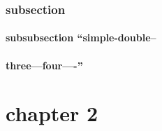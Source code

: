\documentclass{book}
\renewcommand{\_}{\Texinfounderscore\discretionary{}{}{}}
\begin{document}
\subsection{{subsection}}
\label{anchor:subsection}%


\label{anchor:anchor}%

\subsubsection{{subsubsection ``simple-double--}}
\label{anchor:subsubsection-_0060_0060simple_002ddouble_002d_002d}%

\subsubsection{{three---four----''}}
\label{anchor:subsubsection-three_002d_002d_002dfour_002d_002d_002d_002d_0027_0027}%

\chapter*{{\centering chapter 2}}
\label{anchor:chapter2}%

\printindex[cp]
\printindex[fn]
\end{document}
